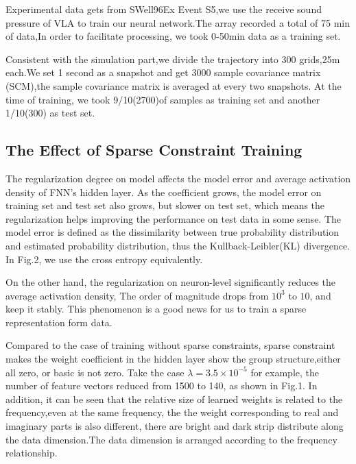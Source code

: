 Experimental data gets from SWell96Ex Event S5,we use the receive sound pressure of VLA to train our neural network.The array recorded a total of 75 min of data,In order to facilitate processing, we took 0\--50min data as a training set.

Consistent with the simulation part,we divide the trajectory into 300 grids,25m each.We set 1 second as a snapshot and get 3000 sample covariance matrix (SCM),the sample covariance matrix is averaged at every two snapshots.
At the time of training, we took 9/10(2700)of samples as training set and another 1/10(300) as test set.

\subsection{The Effect of Sparse Constraint Training}
The regularization degree on model affects the model error and average activation density of FNN's hidden layer. As the coefficient grows, the model error on training set and test set also grows, but slower on test set, which means 
the regularization helps improving the performance on test data in some sense. The model error is defined as the dissimilarity between true probability distribution and estimated probability distribution, thus the Kullback-Leibler(KL) divergence. 
In Fig.2, we use the cross entropy equivalently.

On the other hand, the regularization on neuron-level significantly reduces the average activation density, 
The order of magnitude drops from $10^{3}$ to $10$, and keep it stably. This phenomenon is a good news for 
us to train a sparse representation form data. 

Compared to the case of training without sparse constraints, sparse constraint makes the weight coefficient in the hidden layer show the group structure,either all zero, or basic is not zero. Take the case $\lambda=3.5 \times 10^{-5} $ 
for example, the number of feature vectors reduced from 1500 to 140, as shown in Fig.1. In addition, it can be seen that the relative size of learned weights is related to the frequency,even at the same frequency, the the weight corresponding 
to real and imaginary parts is also different, there are bright and dark strip distribute along the data dimension.The data dimension is arranged according to the frequency relationship.

